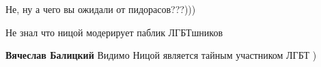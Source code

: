 \begin{itemize}
Не, ну а чего вы ожидали от пидорасов???)))

 
Не знал что ницой модерирует паблик ЛГБТшников

\begin{itemize}
 
\textbf{Вячеслав Балицкий} Видимо Ницой является тайным участником ЛГБТ )
\end{itemize}

\end{itemize}

